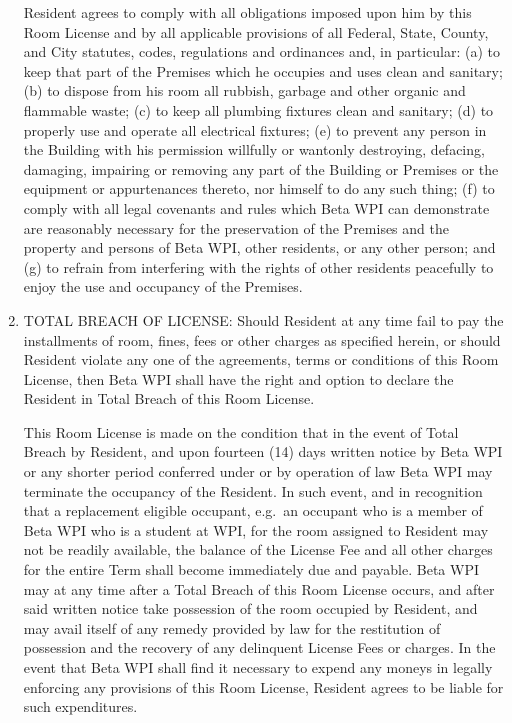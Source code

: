 \documentclass[legalpaper, 12pt]{article}
\begin{document}
\begin{enumerate}
                Resident agrees to comply with all obligations imposed upon him
                by this Room License and by all applicable provisions of all
                Federal, State, County, and City statutes, codes, regulations
                and ordinances and, in particular: (a) to keep that part of the
                Premises which he occupies and uses clean and sanitary; (b) to
                dispose from his room all rubbish, garbage and other organic and
                flammable waste; (c) to keep all plumbing fixtures clean and
                sanitary; (d) to properly use and operate all electrical
                fixtures; (e) to prevent any person in the Building with his
                permission willfully or wantonly destroying, defacing, damaging,
                impairing or removing any part of the Building or Premises or
                the equipment or appurtenances thereto, nor himself to do any
                such thing; (f) to comply with all legal covenants and rules
                which Beta WPI can demonstrate are reasonably necessary for the
                preservation of the Premises and the property and persons of
                Beta WPI, other residents, or any other person; and (g) to
                refrain from interfering with the rights of other residents
                peacefully to enjoy the use and occupancy of the Premises.

        \item TOTAL BREACH OF LICENSE\@:  Should Resident at any time fail to pay
                the installments of room, fines, fees or other charges as
                specified herein, or should Resident violate any one of the
                agreements, terms or conditions of this Room License, then Beta
                WPI shall have the right and option to declare the Resident in
                Total Breach of this Room License.

                This Room License is made on the condition that in the event of
                Total Breach by Resident, and upon fourteen (14) days written
                notice by Beta WPI or any shorter period conferred under or by
                operation of law Beta WPI may terminate the occupancy of the
                Resident.  In such event, and in recognition that a replacement
                eligible occupant, e.g.\ an occupant who is a member of Beta WPI
                who is a student at WPI, for the room assigned to Resident may
                not be readily available, the balance of the License Fee and all
                other charges for the entire Term shall become immediately due
                and payable.  Beta WPI may at any time after a Total Breach of
                this Room License occurs, and after said written notice take
                possession of the room occupied by Resident, and may avail
                itself of any remedy provided by law for the restitution of
                possession and the recovery of any delinquent License Fees or
                charges.  In the event that Beta WPI shall find it necessary to
                expend any moneys in legally enforcing any provisions of this
                Room License, Resident agrees to be liable for such
                expenditures.


\end{enumerate}
\end{document}

